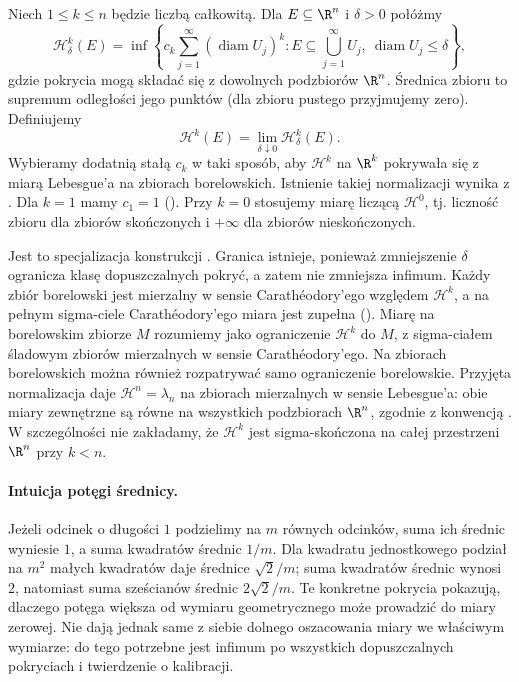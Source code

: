 \begin{definicja}
\label{ma2:def:lebesgue-hausdorff}
Niech $1\le k\le n$ będzie liczbą całkowitą.
Dla $E\subseteq\R^n$ i $\delta>0$ połóżmy
\[
 \mathcal H^k_\delta(E)=
 \inf\left\{c_k\sum_{j=1}^\infty
 (\operatorname{diam}U_j)^k:
 E\subseteq\bigcup_{j=1}^\infty U_j,\ 
 \operatorname{diam}U_j\le\delta\right\},
\]
gdzie pokrycia mogą składać się z dowolnych
podzbiorów $\R^n$. Średnica zbioru to
supremum odległości jego punktów
(dla zbioru pustego przyjmujemy zero).
Definiujemy
\[
 \mathcal H^k(E)=\lim_{\delta\downarrow0}
 \mathcal H^k_\delta(E).
\]
Wybieramy dodatnią stałą $c_k$ w taki sposób,
aby $\mathcal H^k$ na $\R^k$ pokrywała się
z miarą Lebesgue'a na zbiorach borelowskich.
Istnienie takiej normalizacji wynika z
.
Dla $k=1$ mamy $c_1=1$
().
Przy $k=0$ stosujemy miarę liczącą
$\mathcal H^0$, tj. liczność zbioru
dla zbiorów skończonych i $+\infty$
dla zbiorów nieskończonych.
\end{definicja}
Jest to specjalizacja konstrukcji
.
Granica istnieje, ponieważ zmniejszenie
$\delta$ ogranicza klasę dopuszczalnych
pokryć, a zatem nie zmniejsza infimum.
Każdy zbiór borelowski jest mierzalny
w sensie Carathéodory'ego względem
$\mathcal H^k$, a na pełnym sigma-ciele
Carathéodory'ego miara jest zupełna
().
Miarę na borelowskim zbiorze $M$
rozumiemy jako ograniczenie $\mathcal H^k$
do $M$, z sigma-ciałem śladowym zbiorów
mierzalnych w sensie Carathéodory'ego.
Na zbiorach borelowskich można również
rozpatrywać samo ograniczenie borelowskie.
Przyjęta normalizacja daje $\mathcal H^n=\lambda_n$
na zbiorach mierzalnych w sensie Lebesgue'a:
obie miary zewnętrzne są równe na wszystkich
podzbiorach $\R^n$, zgodnie z konwencją
.
W szczególności nie zakładamy, że
$\mathcal H^k$ jest sigma-skończona na całej
przestrzeni $\R^n$ przy $k<n$.

\paragraph{Intuicja potęgi średnicy.}
Jeżeli odcinek o długości $1$ podzielimy
na $m$ równych odcinków, suma ich średnic
wyniesie $1$, a suma kwadratów średnic
$1/m$. Dla kwadratu jednostkowego
podział na $m^2$ małych kwadratów
daje średnice $\sqrt2/m$; suma kwadratów
średnic wynosi $2$, natomiast suma
sześcianów średnic $2\sqrt2/m$.
Te konkretne pokrycia pokazują, dlaczego
potęga większa od wymiaru geometrycznego
może prowadzić do miary zerowej.
Nie dają jednak same z siebie dolnego
oszacowania miary we właściwym wymiarze:
do tego potrzebne jest infimum po
wszystkich dopuszczalnych pokryciach
i twierdzenie o kalibracji.

